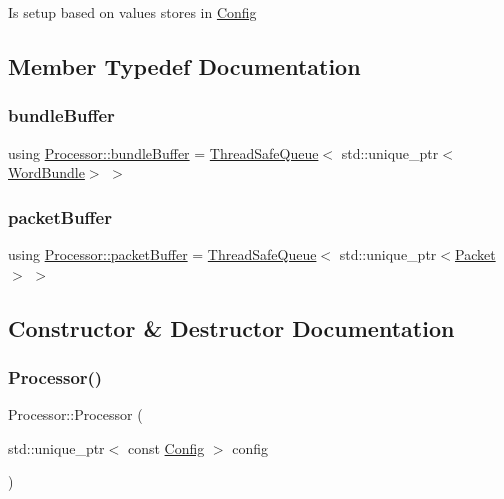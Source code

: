 Is setup based on values stores in \hyperlink{class_config}{Config} 

\subsection{Member Typedef Documentation}
\mbox{\label{class_processor_a531b4c5f7c0d810fc6e9e1dd3d115725}} 
\subsubsection{\texorpdfstring{bundle\+Buffer}{bundleBuffer}}
{\footnotesize\ttfamily using \hyperlink{class_processor_a531b4c5f7c0d810fc6e9e1dd3d115725}{Processor\+::bundle\+Buffer} =  \hyperlink{class_thread_safe_queue}{Thread\+Safe\+Queue}$<$ std\+::unique\+\_\+ptr$<$\hyperlink{class_word_bundle}{Word\+Bundle}$>$ $>$\hspace{0.3cm}{\ttfamily [private]}}

\mbox{\label{class_processor_a0cfd8ed0721769db91c142a19a392e0f}} 
\subsubsection{\texorpdfstring{packet\+Buffer}{packetBuffer}}
{\footnotesize\ttfamily using \hyperlink{class_processor_a0cfd8ed0721769db91c142a19a392e0f}{Processor\+::packet\+Buffer} =  \hyperlink{class_thread_safe_queue}{Thread\+Safe\+Queue}$<$ std\+::unique\+\_\+ptr$<$\hyperlink{class_packet}{Packet}$>$ $>$\hspace{0.3cm}{\ttfamily [private]}}



\subsection{Constructor \& Destructor Documentation}
\mbox{\label{class_processor_a1cc4421ebb02f40665336598c1334c55}} 
\subsubsection{\texorpdfstring{Processor()}{Processor()}}
{\footnotesize\ttfamily Processor\+::\+Processor (\begin{DoxyParamCaption}\item[{std\+::unique\+\_\+ptr$<$ const \hyperlink{class_config}{Config} $>$}]{config }\end{DoxyParamCaption})}



